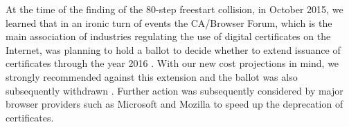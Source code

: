 \medskip

At the time of the finding of the 80-step freestart collision, in October 2015, we learned that in an ironic turn of events the CA/Browser Forum,
which is the main association of industries regulating the use of digital certificates on the Internet,
was planning to hold a ballot to decide whether to extend issuance of \shaone certificates through the year 2016 \cite{cabforum}.
With our new cost projections in mind, we strongly recommended against this extension and the ballot was also subsequently withdrawn \cite{cabforum2}.
Further action was subsequently considered by major browser providers such as Microsoft \cite{MS_sha} and Mozilla \cite{Moz_sha} to speed up the deprecation of \shaone certificates.
